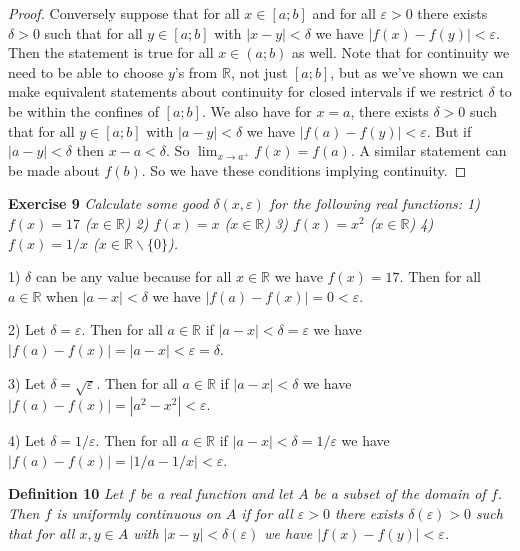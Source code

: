\documentclass{article}
\begin{document}
\begin{flushleft}
\begin{proof}
Conversely suppose that for all $x \in [a;b]$ and for all $\varepsilon > 0$ there exists $\delta > 0$ such that for all $y \in [a;b]$ with $|x-y| < \delta$ we have $|f(x) - f(y)| < \varepsilon$. Then the statement is true for all $x \in (a;b)$ as well. Note that for continuity we need to be able to choose $y$'s from $\mathbb{R}$, not just $[a;b]$, but as we've shown we can make equivalent statements about continuity for closed intervals if we restrict $\delta$ to be within the confines of $[a;b]$. We also have for $x=a$, there exists $\delta > 0$ such that for all $y \in [a;b]$ with $|a-y| < \delta$ we have $|f(a) - f(y)| < \varepsilon$. But if $|a-y| < \delta$ then $x-a < \delta$. So $\lim_{x \rightarrow a^+} f(x) = f(a)$. A similar statement can be made about $f(b)$. So we have these conditions implying continuity.
\end{proof}

\textbf{Exercise 9}
\textsl{Calculate some good $\delta(x, \varepsilon)$ for the following real functions:
1) $f(x) = 17$ ($x \in \mathbb{R}$)
2) $f(x) = x$ ($x \in \mathbb{R}$)
3) $f(x) = x^2$ ($x \in \mathbb{R}$)
4) $f(x) = 1/x$ ($x \in \mathbb{R} \backslash \{0\}$).}\newline

1) $\delta$ can be any value because for all $x \in \mathbb{R}$ we have $f(x)=17$. Then for all $a \in \mathbb{R}$ when $|a-x| < \delta$ we have $|f(a)-f(x)|=0<\varepsilon$.\newline

2) Let $\delta=\varepsilon$. Then for all $a \in \mathbb{R}$ if $|a-x| < \delta = \varepsilon$ we have $|f(a) - f(x)| = |a-x| < \varepsilon = \delta$.\newline

3) Let $\delta=\sqrt{\varepsilon}$. Then for all $a \in \mathbb{R}$ if $|a-x| < \delta$ we have $|f(a)-f(x)| = |a^2-x^2| < \varepsilon$.\newline

4) Let $\delta=1/\varepsilon$. Then for all $a \in \mathbb{R}$ if $|a-x| < \delta=1/\varepsilon$ we have $|f(a)-f(x)| = |1/a - 1/x| < \varepsilon$.\newline

\textbf{Definition 10}
\textsl{Let $f$ be a real function and let $A$ be a subset of the domain of $f$. Then $f$ is uniformly continuous on $A$ if for all $\varepsilon > 0$ there exists $\delta(\varepsilon)>0$ such that for all $x,y \in A$ with $|x-y| < \delta(\varepsilon)$ we have $|f(x) - f(y)| < \varepsilon$.}\newline


\end{flushleft}
\end{document}
